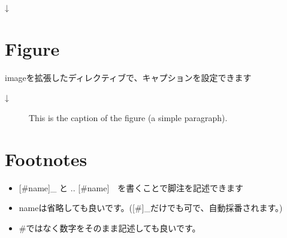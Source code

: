\documentclass[letterpaper,10pt,dvipdfmx,openany,oneside]{sphinxmanual}
\begin{document}
%
\begin{sphinxVerbatim}[commandchars=\\\{\}]
  
     
    
\end{sphinxVerbatim}

↓



\section{Figure}
\label{\detokenize{source/1.chapter/basic_syntax:figure}}
imageを拡張したディレクティブで、キャプションを設定できます

%
\begin{sphinxVerbatim}[commandchars=\\\{\}]
 

  
     
       

            
\end{sphinxVerbatim}

↓

\begin{figure}[htbp]
\centering
\capstart

\noindent{}
\caption{This is the caption of the figure (a simple paragraph).}\label{\detokenize{source/1.chapter/basic_syntax:figure-reference}}\label{\detokenize{source/1.chapter/basic_syntax:id7}}\end{figure}


\section{Footnotes}
\label{\detokenize{source/1.chapter/basic_syntax:footnotes}}\begin{itemize}
\item {} 
{[}\#name{]}\_ と  .. {[}\#name{]}　を書くことで脚注を記述できます

\item {} 
nameは省略しても良いです。({[}\#{]}\_だけでも可で、自動採番されます。)

\item {} 
\#ではなく数字をそのまま記述しても良いです。

\end{itemize}
\end{document}
